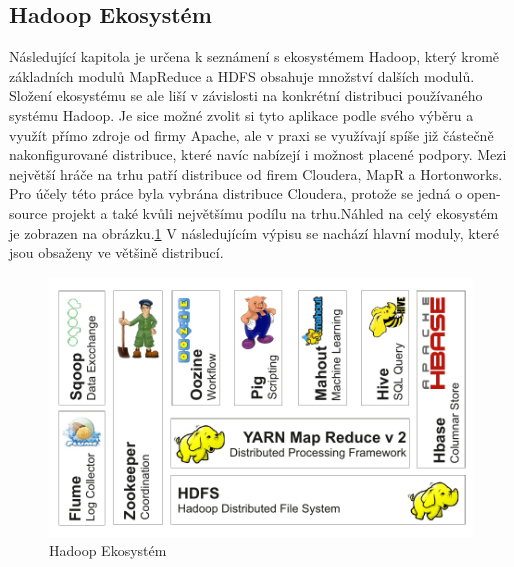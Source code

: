 \documentclass[thesis=M,czech]{FITthesis}[2012/06/26]
\begin{document}
\clearpage
\subsection{Hadoop Ekosystém}
Následující kapitola je určena k seznámení s ekosystémem Hadoop, který kromě základních modulů MapReduce a HDFS obsahuje množství dalších modulů. Složení ekosystému se ale liší v závislosti na konkrétní distribuci používaného systému Hadoop. Je sice možné zvolit si tyto aplikace podle svého výběru a využít přímo zdroje od firmy Apache, ale v praxi se využívají spíše již částečně nakonfigurované distribuce, které navíc nabízejí i možnost placené podpory. Mezi největší hráče na trhu patří distribuce od firem Cloudera, MapR a Hortonworks.\cite{CLOUDERA} Pro účely této práce byla vybrána distribuce Cloudera, protože se jedná o open-source projekt a také kvůli největšímu podílu na trhu.Náhled na celý ekosystém je zobrazen na obrázku.\ref{fig:eko} V následujícím výpisu se nachází hlavní moduly, které jsou obsaženy ve většině distribucí.

\begin{figure}[h]\centering
	\includegraphics[width=1\textwidth, angle=0]{files/HadoopEco}
	\caption[Hadoop Ekosystém]{Hadoop Ekosystém}\label{fig:eko}
\end{figure}
\end{document}
